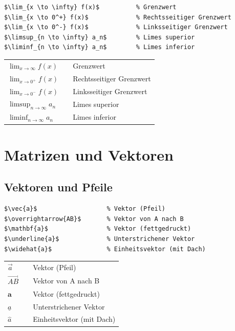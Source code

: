 \documentclass[12pt,a4paper]{article}
\begin{document}
\begin{lstlisting}[style=latex]
$\lim_{x \to \infty} f(x)$   		% Grenzwert
$\lim_{x \to 0^+} f(x)$      		% Rechtsseitiger Grenzwert
$\lim_{x \to 0^-} f(x)$      		% Linksseitiger Grenzwert
$\limsup_{n \to \infty} a_n$ 		% Limes superior
$\liminf_{n \to \infty} a_n$ 		% Limes inferior
\end{lstlisting}

\begin{ausgabe}
\begin{tabular}{l c l}
	$\lim_{x \to \infty} f(x)$ & & Grenzwert\\
	$\lim_{x \to 0^+} f(x)$ & & Rechtsseitiger Grenzwert\\
	$\lim_{x \to 0^-} f(x)$ & & Linksseitiger Grenzwert\\
	$\limsup_{n \to \infty} a_n$ & & Limes superior\\
	$\liminf_{n \to \infty} a_n$ & & Limes inferior
\end{tabular}
\end{ausgabe}



\section{Matrizen und Vektoren}



\subsection{Vektoren und Pfeile}

\begin{lstlisting}[style=latex]
$\vec{a}$                   % Vektor (Pfeil)
$\overrightarrow{AB}$       % Vektor von A nach B
$\mathbf{a}$                % Vektor (fettgedruckt)
$\underline{a}$             % Unterstrichener Vektor
$\widehat{a}$               % Einheitsvektor (mit Dach)
\end{lstlisting}

\begin{ausgabe}
\begin{tabular}{l c l}
	$\vec{a}$ & & Vektor (Pfeil)\\
	$\overrightarrow{AB}$ & & Vektor von A nach B\\
	$\mathbf{a}$ & & Vektor (fettgedruckt)\\
	$\underline{a}$ & & Unterstrichener Vektor\\
	$\widehat{a}$ & & Einheitsvektor (mit Dach)
\end{tabular}
\end{ausgabe}
\end{document}
